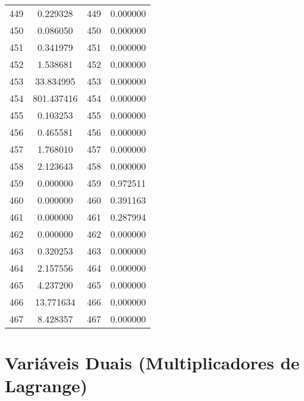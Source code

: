 \documentclass[12pt]{article}
\begin{document}
\begin{longtable}{@{}cccc@{}}
449 & 0.229328 & 449 & 0.000000 \\
450 & 0.086050 & 450 & 0.000000 \\
451 & 0.341979 & 451 & 0.000000 \\
452 & 1.538681 & 452 & 0.000000 \\
453 & 33.834995 & 453 & 0.000000 \\
454 & 801.437416 & 454 & 0.000000 \\
455 & 0.103253 & 455 & 0.000000 \\
456 & 0.465581 & 456 & 0.000000 \\
457 & 1.768010 & 457 & 0.000000 \\
458 & 2.123643 & 458 & 0.000000 \\
459 & 0.000000 & 459 & 0.972511 \\
460 & 0.000000 & 460 & 0.391163 \\
461 & 0.000000 & 461 & 0.287994 \\
462 & 0.000000 & 462 & 0.000000 \\
463 & 0.320253 & 463 & 0.000000 \\
464 & 2.157556 & 464 & 0.000000 \\
465 & 4.237200 & 465 & 0.000000 \\
466 & 13.771634 & 466 & 0.000000 \\
467 & 8.428357 & 467 & 0.000000 \\

\end{longtable}

\section{Variáveis Duais (Multiplicadores de Lagrange)}
\end{document}
